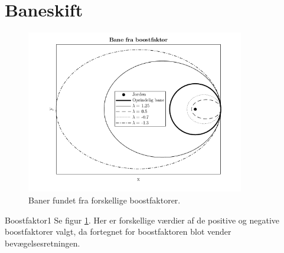 \section*{Baneskift}
%
%
\begin{figure}
	\centering
	\includegraphics[width=0.85\textwidth]{Planetbevaegelse/Boostfaktor_tegninger.png}
	\caption{Baner fundet fra forskellige boostfaktorer.}
	\label{fig:Boostfaktor_tegninger}
\end{figure}
%
\begin{opgave}{Boostfaktor}{1}
Se figur \ref{fig:Boostfaktor_tegninger}. Her er forskellige værdier af de positive og negative boostfaktorer valgt, da fortegnet for boostfaktoren blot vender bevægelsesretningen.
\end{opgave}
%
%
